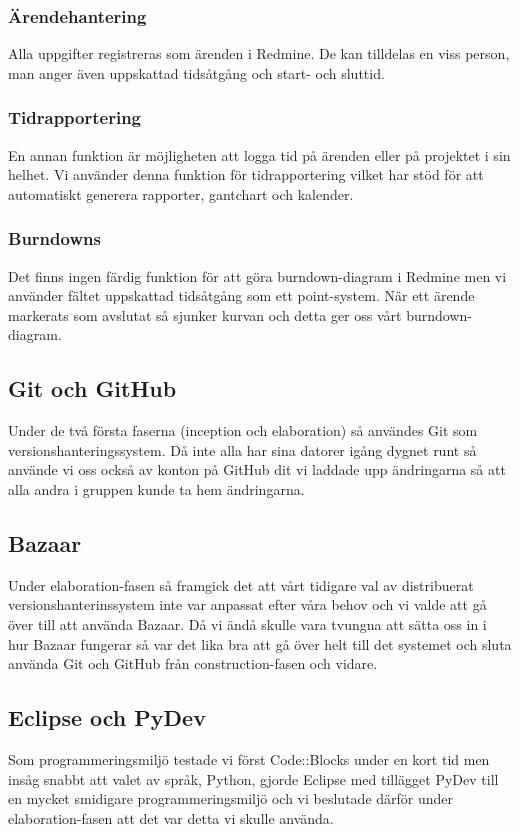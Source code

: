\subsubsection{Ärendehantering}
Alla uppgifter registreras som ärenden i Redmine. De kan tilldelas en viss person, man anger även uppskattad tidsåtgång och start- och sluttid.

\subsubsection{Tidrapportering}
En annan funktion är möjligheten att logga tid på ärenden eller på projektet i sin helhet. Vi använder denna funktion för tidrapportering vilket har stöd för att automatiskt generera rapporter, gantchart och kalender.

\subsubsection{Burndowns}
Det finns ingen färdig funktion för att göra burndown-diagram i Redmine men vi använder fältet uppskattad tidsåtgång som ett point-system. När ett ärende markerats som avslutat så sjunker kurvan och detta ger oss vårt burndown-diagram.

\subsection{Git och GitHub}
Under de två första faserna (inception och elaboration) så användes Git som versionshanteringssystem. Då inte alla har sina datorer igång dygnet runt så använde vi oss också av konton på GitHub dit vi laddade upp ändringarna så att alla andra i gruppen kunde ta hem ändringarna.

\subsection{Bazaar}
Under elaboration-fasen så framgick det att vårt tidigare val av distribuerat versionshanterinssystem inte var anpassat efter våra behov och vi valde att gå över till att använda Bazaar. Då vi ändå skulle vara tvungna att sätta oss in i hur Bazaar fungerar så var det lika bra att gå över helt till det systemet och sluta använda Git och GitHub från construction-fasen och vidare.

\subsection{Eclipse och PyDev}
Som programmeringsmiljö testade vi först Code::Blocks under en kort tid men insåg snabbt att valet av språk, Python, gjorde Eclipse med tillägget PyDev till en mycket smidigare programmeringsmiljö och vi beslutade därför under elaboration-fasen att det var detta vi skulle använda.

